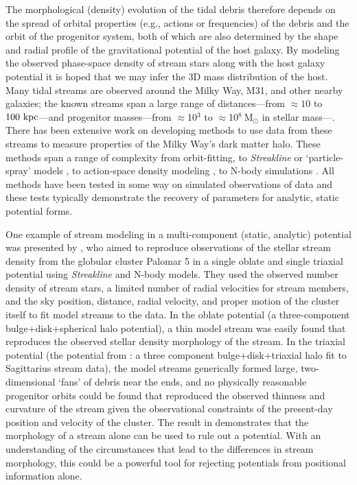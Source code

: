 \documentclass[letterpaper,12pt,preprint]{aastex}
\newcommand{\msun}{\ensuremath{\mathrm{M}_\odot}}
\newcommand{\chchchanges}[1]{{\color{red} {#1}}}
\begin{document}
The morphological (density) evolution of the tidal debris therefore depends on the spread of orbital properties (e.g., actions or frequencies) of the debris and the orbit of the progenitor system, both of which are also determined by the shape and radial profile of the gravitational potential of the host galaxy. By modeling the observed phase-space density of stream stars along with the host galaxy potential it is hoped that we may infer the 3D mass distribution of the host. Many tidal streams are observed around the Milky Way, M31, and other nearby galaxies; the known streams span a large range of distances---from $\approx10$ to $100~{\rm kpc}$---and progenitor masses---from $\approx$10$^3$ to $\approx$10$^8~\msun$ in stellar mass---\citep[][]{ibata94,odenkirchen01,belokurov06,grillmair06a,grillmair06b,bonaca12}. There has been extensive work on developing methods to use data from these streams to measure properties of \chchchanges{the} Milky Way's dark matter halo. These methods span a range of complexity from orbit-fitting, to \emph{Streakline} \citep{kuepper12} or `particle-spray' models \citep{gibbons14}, to action-space density modeling \citep[e.g.,][]{sanders14, bovy14}, to N-body simulations \citep[e.g.,][]{law10}. All methods have been tested in some way on simulated observations of data and these tests typically demonstrate the recovery of parameters for analytic, static potential forms. 

One example of stream modeling in a multi-component (static, analytic) potential was presented by \citet{pearson15}, who aimed to reproduce observations of the stellar stream density from the globular cluster Palomar 5 in a single oblate and single triaxial potential using \emph{Streakline} \citep{kuepper12} and N-body models. They used the observed number density of stream stars, a limited number of radial velocities for stream members, and the sky position, distance, radial velocity, and proper motion of the cluster itself to fit model streams to the data. In the oblate potential (a three-component bulge+disk+spherical halo potential), a thin model stream was easily found that reproduces the observed stellar density morphology of the stream. In the triaxial potential (the potential from \cite{law10}: a three component bulge+disk+triaxial halo fit to Sagittarius stream data), the model streams generically formed large, two-dimensional `fans' of debris near the ends, and no physically reasonable progenitor orbits could be found that reproduced the observed thinness and curvature of the stream given the observational constraints of the present-day position and velocity of the cluster. The result in \citet{pearson15} demonstrates that the morphology of a stream alone can be used to rule out a potential. With an understanding of the circumstances that lead to the differences in stream morphology, this could be a powerful tool for rejecting potentials from positional information alone.
\end{document}
